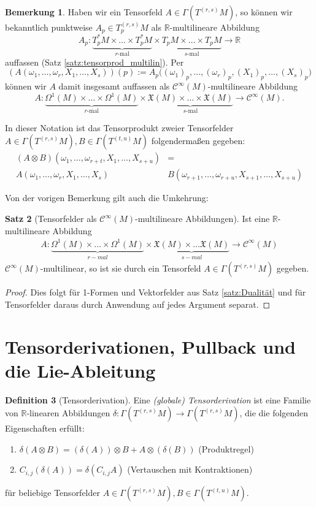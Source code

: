 \documentclass[a4paper]{scrreprt}
\numberwithin{equation}{chapter}
\newcommand{\R}{\mathbb{R}}
\newcommand{\sC}{\mathcal{C}^{\infty}}
\newcommand{\vf}{\mathfrak{X}}
\theoremstyle{definition}
\newtheorem{defn}{Definition}[section]
\newtheorem{satz}[defn]{Satz}
\newtheorem{bem}[defn]{Bemerkung}
\begin{document}
		\begin{bem}\label{bem:Tensorprodukt_mulitilin}
			Haben wir ein Tensorfeld $A \in \Gamma(T^{(r,s)}M)$, so können wir bekanntlich punktweise $A_p \in T^{(r,s)}_pM$ als $\R$-multilineare Abbildung
			\[A_p\colon \underbrace{T_p^*M \times \dots \times T_p^*M}_\text{$r$-mal} \times \underbrace{T_pM \times \dots \times T_pM}_\text{$s$-mal} \to \R\]
			auffassen (Satz \ref{satz:tensorprod_multilin}). Per
			\[(A(\omega_1,\dots,\omega_r, X_1,\dots,X_s))(p) := A_p\Big((\omega_1)_p,\dots,(\omega_r)_p, (X_1)_p,\dots,(X_s)_p\Big)\]
			können wir $A$ damit insgesamt auffassen als $\sC(M)$-multilineare Abbildung
			\[A\colon \underbrace{\Omega^1(M) \times \dots \times \Omega^1(M)}_\text{$r$-mal} \times \underbrace{\vf(M) \times \dots \times \vf(M)}_\text{$s$-mal} \to \sC(M).\]
			
			In dieser Notation ist das Tensorprodukt zweier Tensorfelder $A\in\Gamma(T^{(r,s)}M), B\in \Gamma(T^{(t,u)}M)$ folgendermaßen gegeben:
			\begin{align*}
				(A\otimes B)(\omega_1,\ldots,\omega_{r+t},X_1,\ldots,X_{s+u})&=\\
				A(\omega_1,\ldots,\omega_r,X_1,\ldots,X_s) &B(\omega_{r+1},\ldots,\omega_{r+u},X_{s+1},\ldots,X_{s+u})
			\end{align*}
		\end{bem}
		Von der vorigen Bemerkung gilt auch die Umkehrung:
		\begin{satz}[Tensorfelder als $\sC(M)$-multilineare Abbildungen]
			Ist eine $\R$-multilineare Abbildung
			\begin{align*}
				A\colon \underbrace{\Omega^1(M)\times\dots\times\Omega^1(M)}_{r-mal}\times\underbrace{\vf(M)\times\dots\vf(M)}_{s-mal}\rightarrow \sC(M)
			\end{align*}
			$\sC(M)$-multilinear, so ist sie durch ein Tensorfeld $A \in \Gamma(T^{(r,s)}M)$ gegeben.
			\begin{proof}
				Dies folgt für 1-Formen und Vektorfelder aus Satz \ref{satz:Dualität} und für Tensorfelder daraus durch Anwendung \glqq auf jedes Argument separat\grqq .
			\end{proof}
		\end{satz}

	\section{Tensorderivationen, Pullback und die Lie-Ableitung}
		\begin{defn}[Tensorderivation]
			Eine \emph{(globale) Tensorderivation} ist eine Familie von $\R$-linearen Abbildungen $\delta\colon\Gamma(T^{(r,s)}M)\rightarrow \Gamma(T^{(r,s)}M)$, die die folgenden Eigenschaften erfüllt:
			\begin{enumerate}[label=\arabic*.]
				\item $\delta (A\otimes B)=(\delta(A))\otimes B+A\otimes(\delta(B))$ (Produktregel)
				\item $C_{i,j}(\delta(A))=\delta(C_{i,j}A)$ (Vertauschen mit Kontraktionen)
			\end{enumerate}
			für beliebige Tensorfelder $A\in \Gamma(T^{(r,s)}M), B\in\Gamma(T^{(t,u)}M)$.
		\end{defn}
		
\end{document}
